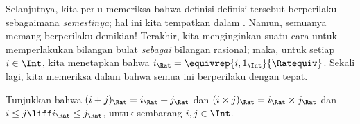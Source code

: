 \documentclass[../../../include/open-logic-section]{subfiles}
\begin{document}
Selanjutnya, kita perlu memeriksa bahwa definisi-definisi tersebut
berperilaku sebagaimana \emph{semestinya}; hal ini kita tempatkan dalam
. Namun, semuanya memang berperilaku demikian!{} Terakhir, kita
menginginkan suatu cara untuk memperlakukan bilangan bulat \emph{sebagai}
bilangan rasional; maka, untuk setiap $i \in \Int$, kita menetapkan bahwa
$i_\Rat = \equivrep{i, 1_\Int}{\Ratequiv}$. Sekali lagi, kita memeriksa
dalam  bahwa semua ini berperilaku dengan tepat.

\begin{prob}
Tunjukkan bahwa $(i + j)_\Rat = i_\Rat+ j_\Rat$ dan $(i \times j)_\Rat =
i_\Rat \times j_\Rat$ dan $i \leq j \liff i_\Rat \leq j_\Rat$, untuk
sembarang $i, j \in \Int$.
\end{prob}
\end{document}
